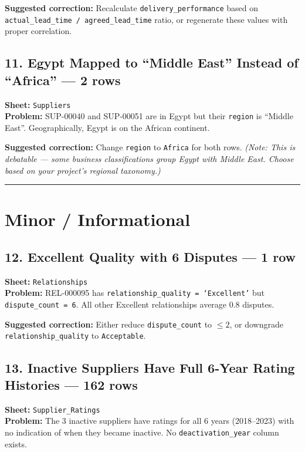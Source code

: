 \documentclass[11pt]{article}
\begin{document}
\noindent\textbf{Suggested correction:} Recalculate \texttt{delivery\_performance} based on \texttt{actual\_lead\_time / agreed\_lead\_time} ratio, or regenerate these values with proper correlation.

\bigskip

\subsection*{11. Egypt Mapped to ``Middle East'' Instead of ``Africa'' --- 2 rows}
\textbf{Sheet:} \texttt{Suppliers}\\
\textbf{Problem:} SUP-00040 and SUP-00051 are in Egypt but their \texttt{region} is ``Middle East''. Geographically, Egypt is on the African continent.

\medskip
\noindent\textbf{Suggested correction:} Change \texttt{region} to \texttt{Africa} for both rows. \emph{(Note: This is debatable --- some business classifications group Egypt with Middle East. Choose based on your project's regional taxonomy.)}

\bigskip
\hrule
\bigskip

\section*{\textcolor{okgreen}{Minor / Informational}}

\subsection*{12. Excellent Quality with 6 Disputes --- 1 row}
\textbf{Sheet:} \texttt{Relationships}\\
\textbf{Problem:} REL-000095 has \texttt{relationship\_quality = `Excellent'} but \texttt{dispute\_count = 6}. All other Excellent relationships average 0.8 disputes.

\medskip
\noindent\textbf{Suggested correction:} Either reduce \texttt{dispute\_count} to $\leq 2$, or downgrade \texttt{relationship\_quality} to \texttt{Acceptable}.

\bigskip

\subsection*{13. Inactive Suppliers Have Full 6-Year Rating Histories --- 162 rows}
\textbf{Sheet:} \texttt{Supplier\_Ratings}\\
\textbf{Problem:} The 3 inactive suppliers have ratings for all 6 years (2018--2023) with no indication of when they became inactive. No \texttt{deactivation\_year} column exists.
\end{document}
